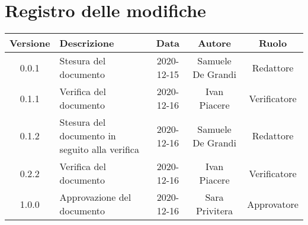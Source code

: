 \section*{Registro delle modifiche}

\begin{center}
	\begin{longtable}{|c|p{5cm}|c|c|c|}
	\hline
	\rowcolor{lighter-grayer}
	\textbf{Versione} & \textbf{Descrizione} & \textbf{Data} & \textbf{Autore} & \textbf{Ruolo} \\
	\hline
	\endfirsthead


		\hline
	0.0.1 & Stesura del documento & 2020-12-15 & Samuele De Grandi & Redattore \\
	\hline
	0.1.1 & Verifica del documento & 2020-12-16 & Ivan Piacere & Verificatore \\
	\hline
	0.1.2 & Stesura del documento in seguito alla verifica & 2020-12-16 & Samuele De Grandi & Redattore \\
	\hline
	0.2.2 & Verifica del documento & 2020-12-16 & Ivan Piacere & Verificatore \\
	\hline
	1.0.0 & Approvazione del documento & 2020-12-16 & Sara Privitera & Approvatore \\
	\hline
    
	\end{longtable}
\end{center}
